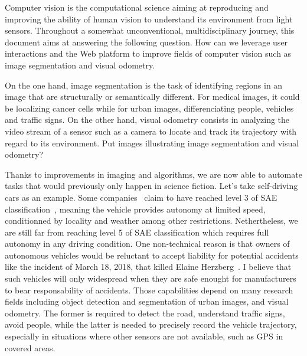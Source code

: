 Computer vision is the computational science aiming at reproducing and improving
the ability of human vision to understand its environment from light sensors.
Throughout a somewhat unconventional, multidisciplinary journey,
this document aims at answering the following question.
How can we leverage user interactions and the Web platform to improve
fields of computer vision such as image segmentation and visual odometry.

On the one hand, image segmentation is the task of identifying regions in an image
that are structurally or semantically different.
For medical images, it could be localizing cancer cells while
for urban images, differenciating people, vehicles and traffic signs.
On the other hand, visual odometry consists in analyzing the video stream of a sensor
such as a camera to locate and track its trajectory with regard to its environment.
\alert{Put images illustrating image segmentation and visual odometry?}

Thanks to improvements in imaging and algorithms,
we are now able to automate tasks that would previously only happen in science fiction.
Let's take self-driving cars as an example.
Some companies~\cite{audia8} claim to have reached level 3 of SAE classification~\cite{sae-cars},
meaning the vehicle provides autonomy at limited speed,
conditionned by locality and weather among other restrictions.
Nethertheless, we are still far from reaching level 5 of SAE classification
which requires full autonomy in any driving condition.
One non-technical reason is that owners of autonomous vehicles would be reluctant
to accept liability for potential accidents like the incident
of March 18, 2018, that killed Elaine Herzberg~\cite{elaineherzberg}.
I believe that such vehicles will only widespread when they are
safe enought for manufacturers to bear responsability of accidents.
Those capabilities depend on many research fields
including object detection and segmentation of urban images, and visual odometry.
The former is required to detect the road, understand traffic signs,
avoid people, while the latter is needed to precisely record
the vehicle trajectory, especially in situations where other sensors
are not available, such as GPS in covered areas.

